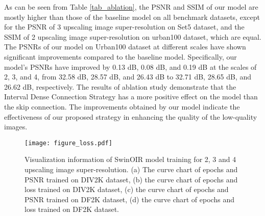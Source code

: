 \documentclass[default,iicol]{sn-jnl}
\theoremstyle{thmstyleone}\newtheorem{theorem}{Theorem}\newtheorem{proposition}[theorem]{Proposition}
\theoremstyle{thmstyletwo}\newtheorem{example}{Example}\newtheorem{remark}{Remark}\theoremstyle{thmstylethree}\newtheorem{definition}{Definition}
\begin{document}
As can be seen from Table \ref{tab_ablation}, the PSNR and SSIM of our model are mostly higher than those of the baseline model on all benchmark datasets, except for the PSNR of 3 upscaling image super-resolution on Set5 dataset, and the SSIM of 2 upscaling image super-resolution on urban100 dataset,  which are equal. The PSNRs of our model on Urban100 dataset at different scales have shown significant improvements compared to the baseline model. Specifically, our model's PSNRs have improved by 0.13 dB, 0.08 dB, and 0.19 dB at the scales of 2, 3, and 4, from 32.58 dB, 28.57 dB, and 26.43 dB to 32.71 dB, 28.65 dB, and 26.62 dB, respectively. The results of ablation study demonstrate that the Interval Dense Connection Strategy has a more positive effect on the model than the skip connection. The improvements obtained by our model indicate the effectiveness of our proposed strategy in enhancing the quality of the low-quality images.

\begin{figure*}[h]
  \centering
  \texttt{[image: figure\_loss.pdf]}
  \caption{Visualization information of SwinOIR model training for 2, 3 and 4 upscaling image super-resolution. (a) The curve chart of epochs and PSNR trained on DIV2K dataset, (b) the curve chart of epochs and loss trained on DIV2K dataset, (c) the curve chart of epochs and PSNR trained on DF2K dataset, (d) the curve chart of epochs and loss trained on DF2K dataset.}
  \label{fig_loss}
\end{figure*}
\end{document}
